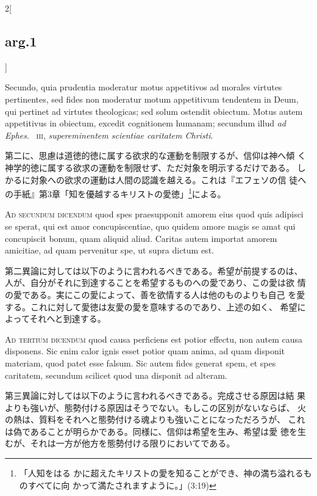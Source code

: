 \documentclass[paper=a4paper,fontsize=10pt,jafontsize=9pt,titlepage]{jlreq}
\begin{document}
\begin{paracol}{2}[\subsection{arg.1}]
\switchcolumn*

Secundo, quia prudentia moderatur motus appetitivos ad morales
 virtutes pertinentes, sed fides non moderatur motum appetitivum
 tendentem in Deum, qui pertinet ad virtutes theologicas; sed solum
 ostendit obiectum. Motus autem appetitivus in obiectum, excedit
 cognitionem humanam; secundum illud {\itshape ad Ephes}.~{\scshape
 iii}, {\itshape supereminentem scientiae caritatem Christi}.

\switchcolumn

第二に、思慮は道徳的徳に属する欲求的な運動を制限するが、信仰は神へ傾
 く神学的徳に属する欲求の運動を制限せず、ただ対象を明示するだけである。
 しかるに対象への欲求の運動は人間の認識を越える。これは『エフェソの信
 徒への手紙』第3章「知を優越するキリストの愛徳」\footnote{「人知をはる
 かに超えたキリストの愛を知ることができ、神の満ち溢れるものすべてに向
 かって満たされますように。」(3:19)}による。

\switchcolumn*[\subsection{ad.2}]

{\scshape Ad secundum dicendum} quod spes praesupponit amorem eius
 quod quis adipisci se sperat, qui est amor concupiscentiae, quo
 quidem amore magis se amat qui concupiscit bonum, quam aliquid
 aliud. Caritas autem importat amorem amicitiae, ad quam pervenitur
 spe, ut supra dictum est.

\switchcolumn

第二異論に対しては以下のように言われるべきである。希望が前提するのは、
 人が、自分がそれに到達することを希望するものへの愛であり、この愛は欲
 情の愛である。実にこの愛によって、善を欲情する人は他のものよりも自己
 を愛する。これに対して愛徳は友愛の愛を意味するのであり、上述の如く、
 希望によってそれへと到達する。

\switchcolumn*[\subsection{ad.3}]

{\scshape Ad tertium dicendum} quod causa perficiens est potior
 effectu, non autem causa disponens. Sic enim calor ignis esset potior
 quam anima, ad quam disponit materiam, quod patet esse falsum. Sic
 autem fides generat spem, et spes caritatem, secundum scilicet quod
 una disponit ad alteram.

\switchcolumn

第三異論に対しては以下のように言われるべきである。完成させる原因は結
 果よりも強いが、態勢付ける原因はそうでない。もしこの区別がないならば、
 火の熱は、質料をそれへと態勢付ける魂よりも強いことになっただろうが、
 これは偽であることが明らかである。同様に、信仰は希望を生み、希望は愛
 徳を生むが、それは一方が他方を態勢付ける限りにおいてである。

\end{paracol}
\end{document}
